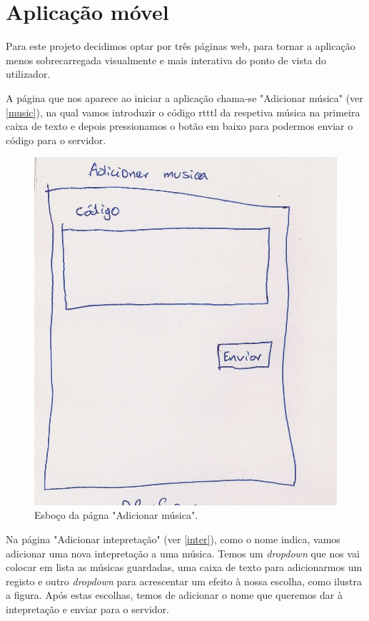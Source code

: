 \section{Aplicação móvel}

Para este projeto decidimos optar por três páginas web, para tornar a aplicação menos sobrecarregada visualmente e mais interativa do ponto de vista do utilizador.

A página que nos aparece ao iniciar a aplicação chama-se "Adicionar música" (ver \autoref{music}), na qual vamos introduzir o código \ac{rtttl} da respetiva música na primeira caixa de texto e depois pressionamos o botão em baixo para podermos enviar o código para o servidor.

\begin{figure}[htp]
\centering
\includegraphics[width=\textwidth]{images/adicionarmusica.jpg}
\caption{Esboço da págna "Adicionar música".}
\label{music}
\end{figure}

Na página "Adicionar intepretação" (ver \autoref{inter}), como o nome indica, vamos adicionar uma nova intepretação a uma música. Temos um \textit{dropdown} que nos vai colocar em lista as músicas guardadas, uma caixa de texto para adicionarmos um registo e outro \textit{dropdown} para acrescentar um efeito à nossa escolha, como ilustra a figura. Após estas escolhas, temos de adicionar o nome que queremos dar à intepretação e enviar para o servidor.

